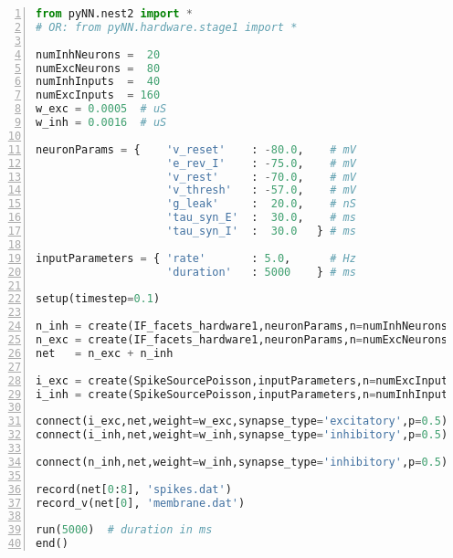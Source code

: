 \documentclass[10pt,a4paper]{scrartcl}
\begin{document}





\newpage
\lstset{tabsize=4,showspaces=false,showtabs=false}
\begin{lstlisting}[basicstyle=\ttfamily\normalsize,frame=single,numbers=left,numberstyle=\small,language=python,caption=PyNN Example Script. For detailed explanation see text.\label{listing_pynn_example}]
from pyNN.nest2 import *  
# OR: from pyNN.hardware.stage1 import *

numInhNeurons =  20
numExcNeurons =  80
numInhInputs  =  40
numExcInputs  = 160
w_exc = 0.0005  # uS
w_inh = 0.0016  # uS

neuronParams = {    'v_reset'    : -80.0,    # mV 
                    'e_rev_I'    : -75.0,    # mV
                    'v_rest'     : -70.0,    # mV
                    'v_thresh'   : -57.0,    # mV
                    'g_leak'     :  20.0,    # nS
                    'tau_syn_E'  :  30.0,    # ms
                    'tau_syn_I'  :  30.0   } # ms 

inputParameters = { 'rate'       : 5.0,      # Hz 
                    'duration'   : 5000    } # ms 

setup(timestep=0.1)

n_inh = create(IF_facets_hardware1,neuronParams,n=numInhNeurons)
n_exc = create(IF_facets_hardware1,neuronParams,n=numExcNeurons)
net   = n_exc + n_inh

i_exc = create(SpikeSourcePoisson,inputParameters,n=numExcInputs)
i_inh = create(SpikeSourcePoisson,inputParameters,n=numInhInputs)

connect(i_exc,net,weight=w_exc,synapse_type='excitatory',p=0.5)
connect(i_inh,net,weight=w_inh,synapse_type='inhibitory',p=0.5)

connect(n_inh,net,weight=w_inh,synapse_type='inhibitory',p=0.5)

record(net[0:8], 'spikes.dat')
record_v(net[0], 'membrane.dat')

run(5000)  # duration in ms
end()
\end{lstlisting}
\vspace{15pt}
\end{document}
